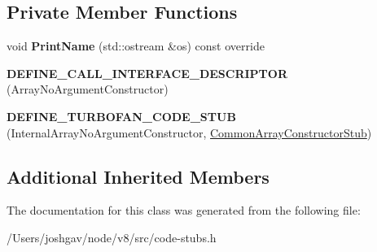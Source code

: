 \subsection*{Private Member Functions}
\begin{DoxyCompactItemize}
\item 
void {\bfseries Print\+Name} (std\+::ostream \&os) const  override\hypertarget{classv8_1_1internal_1_1_internal_array_no_argument_constructor_stub_afd3431d890fb8694e4a6721357963392}{}\label{classv8_1_1internal_1_1_internal_array_no_argument_constructor_stub_afd3431d890fb8694e4a6721357963392}

\item 
{\bfseries D\+E\+F\+I\+N\+E\+\_\+\+C\+A\+L\+L\+\_\+\+I\+N\+T\+E\+R\+F\+A\+C\+E\+\_\+\+D\+E\+S\+C\+R\+I\+P\+T\+OR} (Array\+No\+Argument\+Constructor)\hypertarget{classv8_1_1internal_1_1_internal_array_no_argument_constructor_stub_a95d1939c0a5cf4f79dd811516ca22148}{}\label{classv8_1_1internal_1_1_internal_array_no_argument_constructor_stub_a95d1939c0a5cf4f79dd811516ca22148}

\item 
{\bfseries D\+E\+F\+I\+N\+E\+\_\+\+T\+U\+R\+B\+O\+F\+A\+N\+\_\+\+C\+O\+D\+E\+\_\+\+S\+T\+UB} (Internal\+Array\+No\+Argument\+Constructor, \hyperlink{classv8_1_1internal_1_1_common_array_constructor_stub}{Common\+Array\+Constructor\+Stub})\hypertarget{classv8_1_1internal_1_1_internal_array_no_argument_constructor_stub_a684b6a4489445562af2ed4653a662bb5}{}\label{classv8_1_1internal_1_1_internal_array_no_argument_constructor_stub_a684b6a4489445562af2ed4653a662bb5}

\end{DoxyCompactItemize}
\subsection*{Additional Inherited Members}


The documentation for this class was generated from the following file\+:\begin{DoxyCompactItemize}
\item 
/\+Users/joshgav/node/v8/src/code-\/stubs.\+h\end{DoxyCompactItemize}
